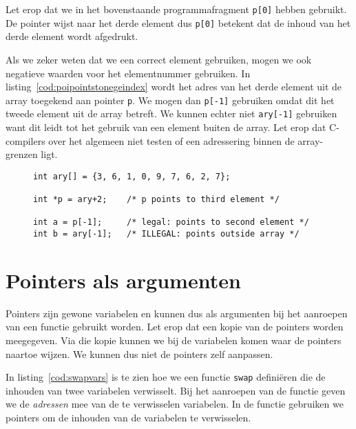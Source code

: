 Let erop dat we in het bovenstaande programmafragment \texttt{p[0]} hebben gebruikt. De pointer wijst naar het derde element dus \texttt{p[0]} betekent dat de inhoud van het derde element wordt afgedrukt.

Als we zeker weten dat we een correct element gebruiken, mogen we ook negatieve waarden voor het elementnummer gebruiken. In listing~\ref{cod:poipointstonegeindex} wordt het adres van het derde element uit de array toegekend aan pointer \texttt{p}. We mogen dan \texttt{p[-1]} gebruiken omdat dit het tweede element uit de array betreft. We kunnen echter niet \texttt{ary[-1]} gebruiken want dit leidt tot het gebruik van een element buiten de array. Let erop dat C-compilers over het algemeen niet testen of een adressering binnen de array-grenzen ligt.

\begin{figure}[!ht]
\begin{lstlisting}[caption=Pointer die naar een element in een array wijst.,label=cod:poipointstonegeindex]
int ary[] = {3, 6, 1, 0, 9, 7, 6, 2, 7};

int *p = ary+2;    /* p points to third element */

int a = p[-1];     /* legal: points to second element */
int b = ary[-1];   /* ILLEGAL: points outside array */
\end{lstlisting}
\end{figure}


\section{Pointers als argumenten}
\label{sec:pointersalsfunctieargumenten}
Pointers zijn gewone variabelen en kunnen dus als argumenten bij het aanroepen van een functie gebruikt worden. Let erop dat een kopie van de pointers worden meegegeven. Via die kopie kunnen we bij de variabelen komen waar de pointers naartoe wijzen. We kunnen dus niet de pointers zelf aanpassen.

In listing~\ref{cod:swapvars} is te zien hoe we een functie \texttt{swap} definiëren die de inhouden van twee variabelen verwisselt. Bij het aanroepen van de functie geven we de \textsl{adressen} mee van de te verwisselen variabelen. In de functie gebruiken we pointers om de inhouden van de variabelen te verwisselen.


